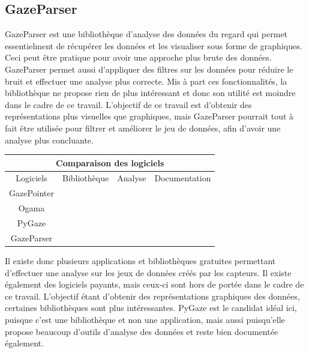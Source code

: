\documentclass[12pt]{article}
\newcommand{\cmark}{\ding{51}}
\newcommand{\xmark}{\ding{55}}
\begin{document}
\subsection{GazeParser}

GazeParser \cite{gazeparser} est une bibliothèque d'analyse des données du
regard qui permet essentielment de récupérer les données et les visualiser sous
forme de graphiques. Ceci peut être pratique pour avoir une approche plus brute
des données. GazeParser permet aussi d'appliquer des filtres sur les données
pour réduire le bruit et effectuer une analyse plus correcte. Mis à part ces
fonctionnalités, la bibliothèque ne propose rien de plus intéressant et donc son
utilité est moindre dans le cadre de ce travail. L'objectif de ce travail est
d'obtenir des représentations plus visuelles que graphiques, mais GazeParser
pourrait tout à fait être utilisée pour filtrer et améliorer le jeu de données,
afin d'avoir une analyse plus concluante.

\begin{center}
  \begin{tabular}{|c||c|c|c|}
    \hline
    \multicolumn{4}{|c|}{Comparaison des logiciels}                            \\
    \hline
    Logiciels   & Bibliothèque & Analyse               & Documentation         \\
    \hline
    GazePointer & \xmark       & \cmark                & \cmark                \\
    Ogama       & \xmark       & \cmark \cmark  \cmark & \cmark \cmark         \\
    PyGaze      & \cmark       & \cmark \cmark  \cmark & \cmark \cmark  \cmark \\
    GazeParser  & \cmark       & \cmark                & \cmark \cmark         \\
    \hline
  \end{tabular}
\end{center}

Il existe donc plusieurs applications et bibliothèques gratuites permettant
d'effectuer une analyse sur les jeux de données créés par les capteurs. Il
existe également des logiciels payants, mais ceux-ci sont hors de portée dans le
cadre de ce travail. L'objectif étant d'obtenir des représentations graphiques
des données, certaines bibliothèques sont plus intéressantes. PyGaze est le
candidat idéal ici, puisque c'est une bibliothèque et non une application, mais
aussi puisqu'elle propose beaucoup d'outils d'analyse des données et reste bien
documentée également.
\end{document}
